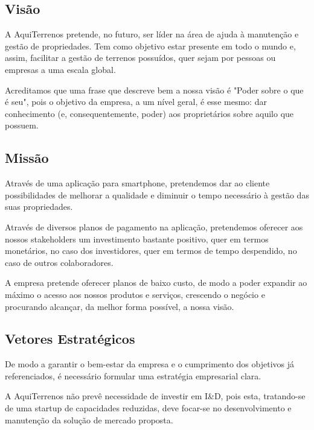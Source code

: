 \documentclass[11pt]{article}
\begin{document}
	\vspace{1cm}
	
	\large
	\subsection{Visão}
	
	\normalsize
	
	A AquiTerrenos pretende, no futuro, ser líder na área de ajuda à manutenção e gestão de propriedades. Tem como objetivo estar presente em todo o mundo e, assim, facilitar a gestão de terrenos possuídos, quer sejam por pessoas ou empresas a uma escala global.
	
	Acreditamos que uma frase que descreve bem a nossa visão é "Poder sobre o que é seu", pois o objetivo da empresa, a um nível geral, é esse mesmo: dar conhecimento (e, consequentemente, poder) aos proprietários sobre aquilo que possuem.
	
	\large
	\subsection{Missão}
	
	\normalsize
	
	Através de uma aplicação para smartphone, pretendemos dar ao cliente possibilidades de melhorar a qualidade e diminuir o tempo necessário à gestão das suas propriedades.
	
	Através de diversos planos de pagamento na aplicação, pretendemos oferecer aos nossos stakeholders um investimento bastante positivo, quer em termos monetários, no caso dos investidores, quer em termos de tempo despendido, no caso de outros colaboradores.
	
	A empresa pretende oferecer planos de baixo custo, de modo a poder expandir ao máximo o acesso aos nossos produtos e serviços, crescendo o negócio e procurando alcançar, da melhor forma possível, a nossa visão.
	
	\large
	\subsection{Vetores Estratégicos}
	
	\normalsize
	
	De modo a garantir o bem-estar da empresa e o cumprimento dos objetivos já referenciados, é necessário formular uma estratégia empresarial clara.
	
	A AquiTerrenos não prevê necessidade de investir em I\&D, pois esta, tratando-se de uma startup de capacidades reduzidas, deve focar-se no desenvolvimento e manutenção da solução de mercado proposta.
	
\end{document}

